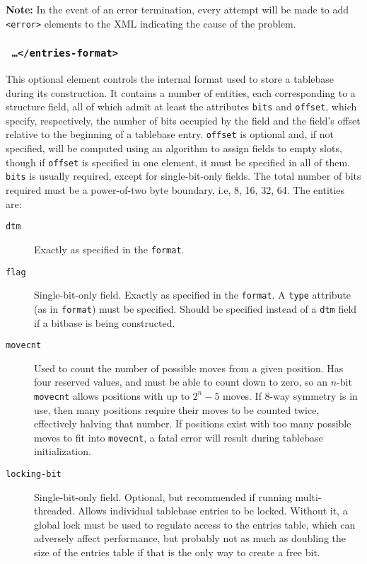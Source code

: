 \documentclass[11pt]{article}
\begin{document}
{\bf Note:} In the event of an error termination, every attempt will
be made to add {\tt <error>} elements to the XML indicating the
cause of the problem.

\subsubsection{\tt <entries-format> \ldots\quad </entries-format>}

This optional element controls the internal format used to store a
tablebase during its construction.  It contains a number of entities,
each corresponding to a structure field, all of which admit at least
the attributes {\tt bits} and {\tt offset}, which specify,
respectively, the number of bits occupied by the field and the field's
offset relative to the beginning of a tablebase entry.  {\tt offset}
is optional and, if not specified, will be computed using an algorithm
to assign fields to empty slots, though if {\tt offset} is specified
in one element, it must be specified in all of them. {\tt bits} is
usually required, except for single-bit-only fields.  The total number
of bits required must be a power-of-two byte boundary, i.e, 8, 16, 32,
64.  The entities are:

\begin{description}

\item[{\tt dtm}] Exactly as specified in the {\tt format}.

\item[{\tt flag}] Single-bit-only field.  Exactly as specified in the
{\tt format}.  A {\tt type} attribute (as in {\tt format}) must be
specified.  Should be specified instead of a {\tt dtm} field if a
bitbase is being constructed.

\item[{\tt movecnt}] Used to count the number of possible moves from a
given position.  Has four reserved values, and must be able to count
down to zero, so an $n$-bit {\tt movecnt} allows positions with up to
$2^n-5$ moves.  If 8-way symmetry is in use, then many positions
require their moves to be counted twice, effectively halving that
number.  If positions exist with too many possible moves to fit into
{\tt movecnt}, a fatal error will result during tablebase
initialization.

\item[{\tt locking-bit}] Single-bit-only field.  Optional, but
recommended if running multi-threaded.  Allows individual tablebase
entries to be locked.  Without it, a global lock must be used to
regulate access to the entries table, which can adversely affect
performance, but probably not as much as doubling the size of the
entries table if that is the only way to create a free bit.

\end{description}
\end{document}
